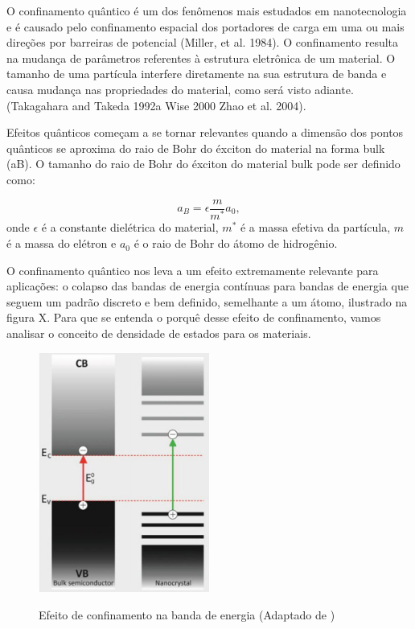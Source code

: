 \par O confinamento quântico é um  dos fenômenos mais estudados em nanotecnologia e é causado pelo confinamento espacial dos portadores de carga em uma ou mais direções por barreiras de potencial (Miller, et al. 1984). O confinamento resulta na mudança de parâmetros referentes à estrutura eletrônica de um material. O tamanho de uma partícula interfere diretamente na sua estrutura de banda e causa mudança nas propriedades do material, como será visto adiante. (Takagahara and Takeda  1992a Wise  2000 Zhao  et  al.  2004).

\par Efeitos quânticos começam a se tornar relevantes quando a dimensão dos pontos quânticos se aproxima do raio de Bohr do éxciton do material na forma bulk (aB). O tamanho do raio de Bohr do éxciton do material bulk pode ser definido\cite{confinamento1} como:

\begin{equation}
	\label{confinamento_1}
	a_{B} = \epsilon \frac{m}{m^{\ast}}a_{0},
\end{equation}
onde $\epsilon$ é a constante dielétrica do material, $m^{\ast}$ é a massa efetiva da partícula, $m$ é a massa do elétron e $a_{0}$ é o raio de Bohr do átomo de hidrogênio.
 
\par O confinamento quântico nos leva a um efeito extremamente relevante para aplicações: o colapso das bandas de energia contínuas para bandas de energia que seguem um padrão discreto e bem definido, semelhante a um átomo, ilustrado na figura X. Para que se entenda o porquê desse efeito de confinamento, vamos analisar o conceito de densidade de estados para os materiais.
\begin{figure}[H]
  \caption{Efeito de confinamento na banda de energia (Adaptado de \cite{bulk2})}
  \centering
  \includegraphics[width=0.5\textwidth]{images/figura9.jpg}
  \label{fig9}
\end{figure}

